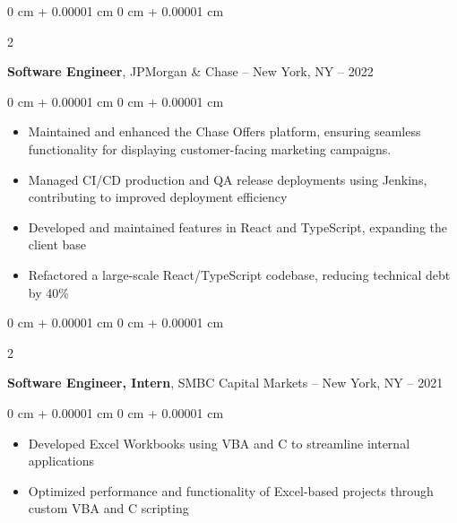 \documentclass[10pt, letterpaper]{article}
\newenvironment{highlights}{
    \begin{itemize}[
        topsep=0.10 cm,
        parsep=0.10 cm,
        partopsep=0pt,
        itemsep=0pt,
        leftmargin=0 cm + 10pt
    ]
}{
    \end{itemize}
} %
\newenvironment{onecolentry}{
    \begin{adjustwidth}{
        0 cm + 0.00001 cm
    }{
        0 cm + 0.00001 cm
    }
}{
    \end{adjustwidth}
} %
\newenvironment{twocolentry}[2][]{
    \onecolentry
    \def\secondColumn{#2}
    \setcolumnwidth{\fill, 4.5 cm}
    \begin{paracol}{2}
}{
    \switchcolumn \raggedleft \secondColumn
    \end{paracol}
    \endonecolentry
} %
\begin{document}
        \vspace{0.4 cm}

        \begin{twocolentry}{
            2021 -- 2022
        }
            \textbf{Software Engineer}, JPMorgan \& Chase -- New York, NY\end{twocolentry}

        \vspace{0.10 cm}
        \begin{onecolentry}
            \begin{highlights}
                \item Maintained and enhanced the Chase Offers platform, ensuring seamless functionality for displaying customer-facing marketing campaigns.
                \item Managed CI/CD production and QA release deployments using Jenkins, contributing to improved deployment efficiency
                \item Developed and maintained features in React and TypeScript, expanding the client base
                \item Refactored a large-scale React/TypeScript codebase, reducing technical debt by 40\%
            \end{highlights}
        \end{onecolentry}


        \vspace{0.35 cm}

        \begin{twocolentry}{
            2020 -- 2021
        }
            \textbf{Software Engineer, Intern}, SMBC Capital Markets -- New York, NY\end{twocolentry}

        \vspace{0.10 cm}
        \begin{onecolentry}
            \begin{highlights}
                \item Developed Excel Workbooks using VBA and C to streamline internal applications
                \item Optimized performance and functionality of Excel-based projects through custom VBA and C scripting
            \end{highlights}
        \end{onecolentry}


        \vspace{0.35 cm}
\end{document}
